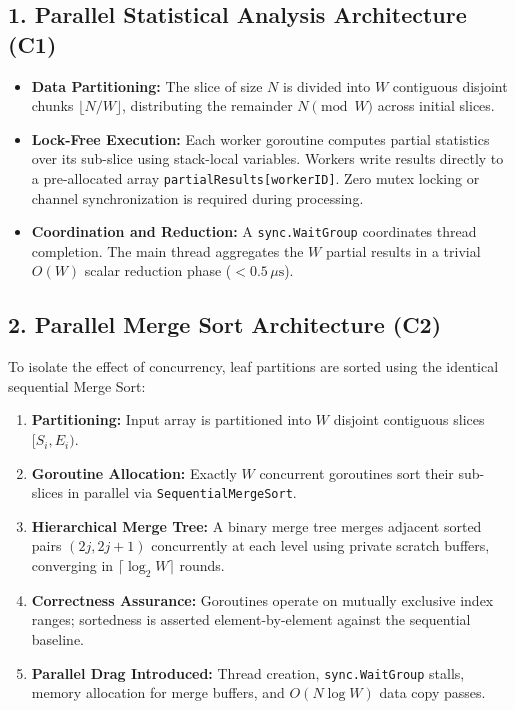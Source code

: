 \documentclass[11pt]{article}
\begin{document}
\subsection*{1. Parallel Statistical Analysis Architecture (C1)}
\begin{itemize}
    \item \textbf{Data Partitioning:} The slice of size $N$ is divided into $W$ contiguous disjoint chunks $\lfloor N/W \rfloor$, distributing the remainder $N \pmod W$ across initial slices.
    \item \textbf{Lock-Free Execution:} Each worker goroutine computes partial statistics over its sub-slice using stack-local variables. Workers write results directly to a pre-allocated array \texttt{partialResults[workerID]}. Zero mutex locking or channel synchronization is required during processing.
    \item \textbf{Coordination and Reduction:} A \texttt{sync.WaitGroup} coordinates thread completion. The main thread aggregates the $W$ partial results in a trivial $O(W)$ scalar reduction phase ($< 0.5\,\mu\text{s}$).
\end{itemize}

\subsection*{2. Parallel Merge Sort Architecture (C2)}
To isolate the effect of concurrency, leaf partitions are sorted using the identical sequential Merge Sort:
\begin{enumerate}[itemsep=0.2em]
    \item \textbf{Partitioning:} Input array is partitioned into $W$ disjoint contiguous slices $[S_i, E_i)$.
    \item \textbf{Goroutine Allocation:} Exactly $W$ concurrent goroutines sort their sub-slices in parallel via \texttt{SequentialMergeSort}.
    \item \textbf{Hierarchical Merge Tree:} A binary merge tree merges adjacent sorted pairs $(2j, 2j+1)$ concurrently at each level using private scratch buffers, converging in $\lceil \log_2 W \rceil$ rounds.
    \item \textbf{Correctness Assurance:} Goroutines operate on mutually exclusive index ranges; sortedness is asserted element-by-element against the sequential baseline.
    \item \textbf{Parallel Drag Introduced:} Thread creation, \texttt{sync.WaitGroup} stalls, memory allocation for merge buffers, and $O(N \log W)$ data copy passes.
\end{enumerate}
\end{document}
